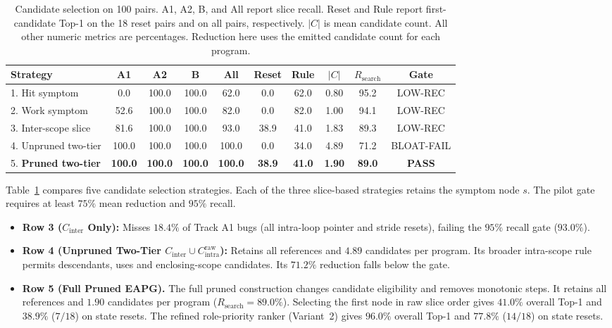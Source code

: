 \documentclass[10pt,conference]{IEEEtran}
\begin{document}
\begin{table}[t]
\centering
\small
\caption{Candidate selection on 100 pairs. A1, A2, B, and All report slice recall. Reset and Rule report first-candidate Top-1 on the 18 reset pairs and on all pairs, respectively. $|C|$ is mean candidate count. All other numeric metrics are percentages. Reduction here uses the emitted candidate count for each program.}
\label{tab:pilot_slicing_recall}
\setlength{\tabcolsep}{4pt}
\begin{tabular}{@{}lccccccccc@{}}
\toprule
\textbf{Strategy} & \textbf{A1} & \textbf{A2} & \textbf{B} & \textbf{All} & \textbf{Reset} & \textbf{Rule} & \textbf{$|C|$} & \textbf{$R_{\text{search}}$} & \textbf{Gate} \\
\midrule
1. Hit symptom & 0.0 & 100.0 & 100.0 & 62.0 & 0.0 & 62.0 & 0.80 & 95.2 & LOW-REC \\
2. Work symptom & 52.6 & 100.0 & 100.0 & 82.0 & 0.0 & 82.0 & 1.00 & 94.1 & LOW-REC \\
3. Inter-scope slice & 81.6 & 100.0 & 100.0 & 93.0 & 38.9 & 41.0 & 1.83 & 89.3 & LOW-REC \\
4. Unpruned two-tier & 100.0 & 100.0 & 100.0 & 100.0 & 0.0 & 34.0 & 4.89 & 71.2 & BLOAT-FAIL \\
5. \textbf{Pruned two-tier} & \textbf{100.0} & \textbf{100.0} & \textbf{100.0} & \textbf{100.0} & \textbf{38.9} & \textbf{41.0} & \textbf{1.90} & \textbf{89.0} & \textbf{PASS} \\
\bottomrule
\end{tabular}
\end{table}

Table~\ref{tab:pilot_slicing_recall} compares five candidate selection strategies. Each of the three slice-based strategies retains the symptom node $s$. The pilot gate requires at least $75\%$ mean reduction and $95\%$ recall.
\begin{itemize}
    \item \textbf{Row 3 ($C_{\text{inter}}$ Only):} Misses $18.4\%$ of Track A1 bugs (all intra-loop pointer and stride resets), failing the $95\%$ recall gate ($93.0\%$).
    \item \textbf{Row 4 (Unpruned Two-Tier $C_{\text{inter}} \cup C_{\text{intra}}^{\text{raw}}$):} Retains all references and $4.89$ candidates per program. Its broader intra-scope rule permits descendants, uses and enclosing-scope candidates. Its $71.2\%$ reduction falls below the gate.
    \item \textbf{Row 5 (Full Pruned EAPG).} The full pruned construction changes candidate eligibility and removes monotonic steps. It retains all references and $1.90$ candidates per program ($R_{\text{search}} = 89.0\%$). Selecting the first node in raw slice order gives $41.0\%$ overall Top-1 and $38.9\%$ ($7/18$) on state resets. The refined role-priority ranker (Variant~2) gives $96.0\%$ overall Top-1 and $77.8\%$ ($14/18$) on state resets.
\end{itemize}
\end{document}
